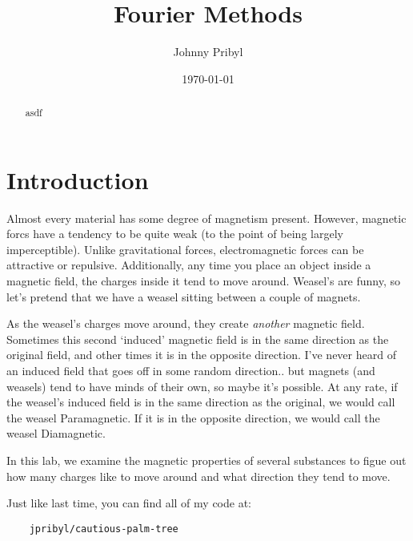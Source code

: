 \documentclass{article}
\date{\today} %
\begin{document}
\title{Fourier Methods}
\author{Johnny Pribyl}
\maketitle

\begin{abstract}

    asdf
    
\end{abstract}



\section{Introduction}

Almost every material has some degree of magnetism present. However, magnetic
forcs have a tendency to be quite weak (to the point of being largely
imperceptible). Unlike gravitational forces, electromagnetic forces can be
attractive or repulsive. Additionally, any time you place an object 
inside a magnetic field, the charges inside it tend to move around. 
Weasel's are funny, so let's pretend that we have a weasel sitting between a couple of magnets.

As the weasel's charges move around, they create \textit{another} magnetic field. 
Sometimes this second `induced' magnetic field is in the same direction as the original field, 
and other times it is in the opposite direction. I've never heard of an induced 
field that goes off in some random direction.. but magnets (and weasels) tend to have 
minds of their own, so maybe it's possible. At any rate, if the weasel's induced 
field is in the same direction as the original, we would call the weasel
Paramagnetic. If it is in the opposite direction, we would call the weasel
Diamagnetic.

In this lab, we examine the magnetic properties of several substances to figue
out how many charges like to move around and what direction they tend to move.

Just like last time, you can find all of my code at:
\begin{verbatim}
    jpribyl/cautious-palm-tree
\end{verbatim}
\end{document}
